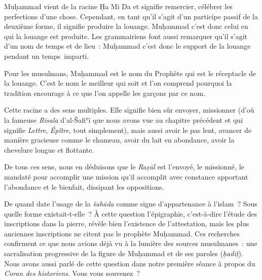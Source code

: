 Muḥammad vient de la racine Ḥa Mi Da et signifie remercier, célébrer les
perfections d'une chose. Cependant, en tant qu'il s'agit d'un participe
passif de la deuxième forme, il signifie produire la louange. Muḥammad
c'est donc celui en qui la louange est produite. Les grammairiens font
aussi remarquer qu'il s'agit d'un nom de temps et de lieu~: Muḥammad
c'est donc le support de la louange pendant un temps~imparti.

Pour les musulmans, Muḥammad est le nom du Prophète qui est le
réceptacle de la louange. C'est le nom le meilleur qui soit et l'on
comprend pourquoi la tradition encourage à ce que l'on appelle les
garçons par ce nom.


Cette racine a des sens multiples. Elle signifie bien sûr envoyer,
missionner (d'où la fameuse \emph{Risala} d'al-Šafiʿī que nous avons vue
au chapitre précédent et qui signifie \emph{Lettre}, \emph{Épître}, tout
simplement), mais aussi avoir le pas lent, avancer de manière gracieuse
comme le chameau, avoir du lait en abondance, avoir la chevelure longue
et flottante.

De tous ces sens, nous en déduisons que le \emph{Raṣūl} est l'envoyé, le
missionné, le mandaté pour accomplir une mission qu'il accomplit avec
constance apportant l'abondance et le bienfait, dissipant les
oppositions.


De quand date l'usage de la \emph{šahāda} comme signe d'appartenance à
l'islam~? Sous quelle forme existait-t-elle~? À cette question
l'épigraphie, c'est-à-dire l'étude des inscriptions dans la pierre,
révèle bien l'existence de l'attestation, mais les plus anciennes
inscriptions ne citent pas le prophète Muḥammad. Ces recherches
confirment ce que nous avions déjà vu à la lumière des sources
musulmanes~: une sacralisation progressive de la figure de Muḥammad et
de ses paroles (\emph{ḥadīṯ}). Nous avons aussi parlé de cette question
dans notre première séance à propos du \emph{Coran des historiens}. Vous
vous souvenez~?

